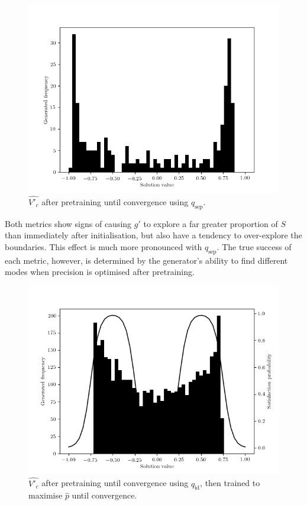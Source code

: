 \documentclass[../../main.tex]{subfiles}
\begin{document}
\begin{figure}[H]
    \begin{center}
    \includegraphics[width=\textwidth]{separationSpread}
    \caption{
        $\hat{V'_c}$ after pretraining until convergence using $q_\text{sep}$.
    }
    \label{fig:separationSpread}
    \end{center}
\end{figure}
Both metrics show signs of causing $g'$ to explore a far greater proportion of $S$ than immediately after initialisation, but also have a tendency to over-explore the boundaries.
This effect is much more pronounced with $q_\text{sep}$.
The true success of each metric, however, is determined by the generator's ability to find different modes when precision is optimised after pretraining.
\begin{figure}[H]
    \begin{center}
    \includegraphics[width=\textwidth]{identityThenPrecision}
    \caption{
        $\hat{V'_c}$ after pretraining until convergence using $q_\text{id}$, then trained to maximise $\hat{p}$ until convergence.
    }
    \label{fig:identityThenPrecision}
    \end{center}
\end{figure}
\end{document}
